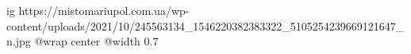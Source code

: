  
 
 
 
 

\ifcmt
  ig https://mistomariupol.com.ua/wp-content/uploads/2021/10/245563134_1546220382383322_5105254239669121647_n.jpg
  @wrap center
  @width 0.7
\fi
